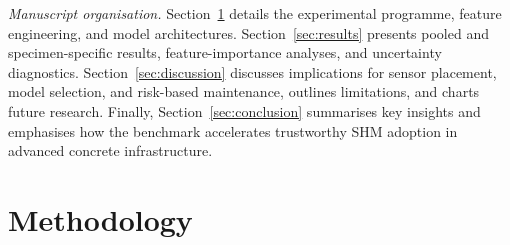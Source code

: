\documentclass{article}
\begin{document}
\smallskip
\noindent\emph{Manuscript organisation.}  
Section~\ref{sec:methodology} details the experimental programme, feature engineering, and model architectures.  Section~\ref{sec:results} presents pooled and specimen-specific results, feature-importance analyses, and uncertainty diagnostics.  Section~\ref{sec:discussion} discusses implications for sensor placement, model selection, and risk-based maintenance, outlines limitations, and charts future research.  Finally, Section~\ref{sec:conclusion} summarises key insights and emphasises how the benchmark accelerates trustworthy SHM adoption in advanced concrete infrastructure.




\section{Methodology}
\label{sec:methodology}
\end{document}
